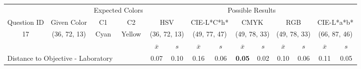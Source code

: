 \begin{table}[H]
  \resizebox{\textwidth}{!} {
  \begin{tabular}{lccccccccccccc}
    \hline
    \multicolumn{1}{c}{}                              &                                      & \multicolumn{2}{c}{Expected Colors}                   & \multicolumn{10}{c}{Possible Results}                                                                                                                                                                                                                                                                                        \\ \cline{3-14}
    \multicolumn{1}{c}{\multirow{-2}{*}{Question ID}} & \multirow{-2}{*}{Given Color}        & C1                       & C2                         & \multicolumn{2}{c}{HSV}                                        & \multicolumn{2}{c}{CIE-L*C*h*}                                 & \multicolumn{2}{c}{CMYK}                                       & \multicolumn{2}{c}{RGB}                                        & \multicolumn{2}{c}{CIE-L*a*b*}                                 \\ \hline
    \multicolumn{1}{c}{17}                             & \cellcolor[HTML]{00FF00}(36, 72, 13) & \multicolumn{1}{c|}{Cyan} & \multicolumn{1}{c|}{Yellow}  & \multicolumn{2}{c|}{\cellcolor[HTML]{00FF00}(36, 72, 13)}      & \multicolumn{2}{c|}{\cellcolor[HTML]{6EFFA3}(49, 77, 47)}       & \multicolumn{2}{c|}{\cellcolor[HTML]{80FF80}(49, 78, 33)}       & \multicolumn{2}{c|}{\cellcolor[HTML]{80FF80}(49, 78, 33)}       & \multicolumn{2}{c|}{\cellcolor[HTML]{C4FF9E}(66, 87, 46)}       \\ \hline
                                                      & \multicolumn{1}{l}{}                 & \multicolumn{1}{l}{}     & \multicolumn{1}{l}{}       & \multicolumn{1}{c}{$\overline{x}$} & \multicolumn{1}{c}{$s$} & \multicolumn{1}{c}{$\overline{x}$} & \multicolumn{1}{c}{$s$} & \multicolumn{1}{c}{$\overline{x}$} & \multicolumn{1}{c}{$s$} & \multicolumn{1}{c}{$\overline{x}$} & \multicolumn{1}{c}{$s$} & \multicolumn{1}{c}{$\overline{x}$} & \multicolumn{1}{c}{$s$} \\ \hline
    \multicolumn{4}{l}{Distance to Objective - Laboratory}                                                                                           & \multicolumn{1}{|c}{0.07}       & \multicolumn{1}{c|}{0.10}    & \multicolumn{1}{|c}{0.16}       & \multicolumn{1}{c|}{0.06}    & \multicolumn{1}{|c}{\textbf{0.05}}       & \multicolumn{1}{c|}{0.02}    & \multicolumn{1}{|c}{0.10}       & \multicolumn{1}{c|}{0.06}    & \multicolumn{1}{|c}{0.11}       & \multicolumn{1}{c|}{0.05}    \\

\end{tabular}}
\end{table}
